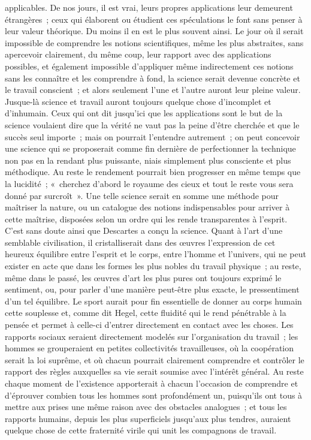 \documentclass[french,twoside]{book} %
\begin{document}
applicables. De nos jours, il est vrai, leurs propres applications leur demeurent étrangères ; ceux qui élaborent ou étudient ces spéculations le font sans penser à leur valeur théorique. Du moins il en est le plus souvent ainsi. Le jour où il serait impossible de comprendre les notions scientifiques, même les plus abstraites, sans apercevoir clairement, du même coup, leur rapport avec des applications possibles, et également impossible d'appliquer même indirectement ces notions sans les connaître et les comprendre à fond, la science serait devenue concrète et le travail conscient ; et alors seulement l'une et l'autre auront leur pleine valeur. Jusque-là science et travail auront toujours quelque chose d'incomplet et d'inhumain. Ceux qui ont dit jusqu'ici que les applications sont le but de la science voulaient dire que la vérité ne vaut pas la peine d'être cherchée et que le succès seul importe ; mais on pourrait l'entendre autrement ; on peut concevoir une science qui se proposerait comme fin dernière de perfectionner la technique non pas en la rendant plus puissante, niais simplement plus consciente et plus méthodique. Au reste le rendement pourrait bien progresser en même temps que la lucidité ; « cherchez d'abord le royaume des cieux et tout le reste vous sera donné par surcroît ». Une telle science serait en somme une méthode pour maîtriser la nature, ou un catalogue des notions indispensables pour arriver à cette maîtrise, disposées selon un ordre qui les rende transparentes à l'esprit. C'est sans doute ainsi que Descartes a conçu la science. Quant à l'art d'une semblable civilisation, il cristalliserait dans des œuvres l'expression de cet heureux équilibre entre l'esprit et le corps, entre l'homme et l'univers, qui ne peut exister en acte que dans les formes les plus nobles du travail physique ; au reste, même dans le passé, les œuvres d'art les plus pures ont toujours exprimé le sentiment, ou, pour parler d'une manière peut-être plus exacte, le pressentiment d'un tel équilibre. Le sport aurait pour fin essentielle de donner au corps humain cette souplesse et, comme dit Hegel, cette fluidité qui le rend pénétrable à la pensée et permet à celle-ci d'entrer directement en contact avec les choses. Les rapports sociaux seraient directement modelés sur l'organisation du travail ; les hommes se grouperaient en petites collectivités travailleuses, où la coopération serait la loi suprême, et où chacun pourrait clairement comprendre et contrôler le rapport des règles auxquelles sa vie serait soumise avec l'intérêt général. Au reste chaque moment de l'existence apporterait à chacun l'occasion de comprendre et d'éprouver combien tous les hommes sont profondément un, puisqu'ils ont tous à mettre aux prises une même raison avec des obstacles analogues ; et tous les rapports humains, depuis les plus superficiels jusqu'aux plus tendres, auraient quelque chose de cette fraternité virile qui unit les compagnons de travail.\par
\end{document}

